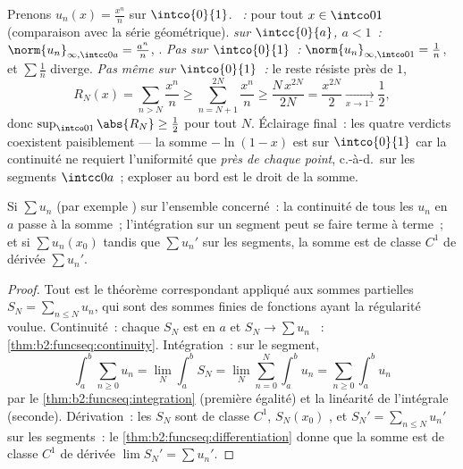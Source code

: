 \begin{example}\label{ex:b2:funcseq:threemodes}
Prenons $u_n(x) = \frac{x^n}{n}$ sur $\intco{0}{1}$. \emph{~:}
 pour tout $x \in \intco01$ (comparaison avec la
série géométrique). \emph{ sur $\intcc{0}{a}$, $a < 1$~:}
$\norm{u_n}_{\infty,\intcc0a} = \frac{a^n}{n}$, .
\emph{Pas  sur $\intco{0}{1}$~:}
$\norm{u_n}_{\infty,\intco01} = \frac1n$, et $\sum\frac1n$
diverge. \emph{Pas même  sur $\intco{0}{1}$~:} le
reste résiste près de $1$,
\[
R_N(x) = \sum_{n>N}\frac{x^n}{n}
\geq \sum_{n=N+1}^{2N}\frac{x^n}{n}
\geq \frac{N\,x^{2N}}{2N} = \frac{x^{2N}}{2}
\xrightarrow[x\to1^-]{} \frac12 ,
\]
donc $\sup_{\intco01}\abs{R_N} \geq \frac12$ pour tout $N$.
Éclairage final~: les quatre verdicts coexistent paisiblement --- la
somme $-\ln(1-x)$ est  sur $\intco{0}{1}$ car la
continuité ne requiert l'uniformité que \emph{près de chaque point},
c.-à-d.\ sur les segments $\intcc0a$~; exploser au bord est le droit
de la somme.
\end{example}

\begin{theorem}\label{thm:b2:funcseq:seriestransfer}
Si $\sum u_n$   (par exemple ) sur
l'ensemble concerné~: la continuité de tous les $u_n$ en $a$ passe à
la somme~; l'intégration sur un segment peut se faire terme à terme~;
et si $\sum u_n(x_0)$  tandis que $\sum u_n'$ 
 sur les segments, la somme est de classe $C^1$ de dérivée
$\sum u_n'$.
\end{theorem}

\begin{proof}
Tout est le théorème correspondant appliqué aux sommes partielles
$S_N = \sum_{n\leq N}u_n$, qui sont des sommes finies de fonctions
ayant la régularité voulue. Continuité~: chaque $S_N$ est  en
$a$ et $S_N \to \sum u_n$ ~:
\cref{thm:b2:funcseq:continuity}. Intégration~: sur le segment,
\[
\int_a^b \sum_{n\geq0} u_n
= \lim_N \int_a^b S_N
= \lim_N \sum_{n=0}^{N}\int_a^b u_n
= \sum_{n\geq0}\int_a^b u_n
\]
par le \cref{thm:b2:funcseq:integration} (première égalité) et la
linéarité de l'intégrale (seconde). Dérivation~: les
$S_N$ sont de classe $C^1$, $S_N(x_0)$ , et $S_N' =
\sum_{n\leq N}u_n'$   sur les segments~: le
\cref{thm:b2:funcseq:differentiation} donne que la somme est de
classe $C^1$ de dérivée $\lim S_N' = \sum u_n'$.
\end{proof}

